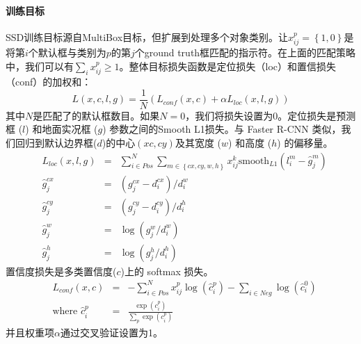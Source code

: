 \documentclass[../main.tex]{subfile}
\begin{document}
\paragraph{训练目标}

SSD训练目标源自MultiBox目标\cite{multibox1, multibox2}，但扩展到处理多个对象类别。让$x_{ij}^p = \left\{ 1, 0 \right\}$是将第$ i $个默认框与类别为$p$的第$j$个ground truth框匹配的指示符。在上面的匹配策略中，我们可以有$\sum_i x_{ij}^p \geq 1$。整体目标损失函数是定位损失（loc）和置信损失（conf）的加权和：
\begin{equation}
    L\left(x, c, l, g\right) = \frac{1}{N}\left( L_{conf}\left(x, c\right) + \alpha L_{loc}\left( x, l, g \right) \right)
\end{equation}
其中$N$是匹配了的默认框数目。如果$N=0$，我们将损失设置为0。定位损失是预测框 ($l$) 和地面实况框 ($g$) 参数之间的Smooth L1损失\cite{fast}。与 Faster R-CNN \cite{faster}类似，我们回归到默认边界框($d$)的中心$\left( xc, cy \right)$及其宽度 ($w$) 和高度 ($h$) 的偏移量。
\begin{equation}
    \begin{aligned}
         & L_{loc}\left( x, l, g \right) & = & \sum_{i\in Pos}^N \sum_{m \in \left\{ cx, cy,w, h \right\} } x_{ij}^k\text{smooth}_{L1}\left( l_i^m - \hat{g}_j^m \right) \\
         & \hat{g}_j^{cx}                & = & \left( g_j^{cx} - d_i^{cx} \right) / d_i^w                                                                                \\
         & \hat{g}_j^{cy}                & = & \left( g_j^{cy} - d_i^{cy} \right) / d_i^h                                                                                \\
         & \hat{g}_j^w                   & = & \log \left( g_j^w / d_i^w \right)                                                                                         \\
         & \hat{g}_j^h                   & = & \log \left( g_j^h / d_i^h \right)
    \end{aligned}
\end{equation}
置信度损失是多类置信度($c$)上的 softmax 损失。
\begin{equation}
    \begin{aligned}
         & L_{conf}\left(x, c\right) & = & -\sum_{i\in Pos}^N x_{ij}^p\log\left(\hat{c}_i^p\right) - \sum_{i\in Neg}\log\left( \hat{c}_i^0 \right) \\
         & \text{where } \hat{c}_i^p & = & \frac{\exp \left( c_i^p \right)}{\sum_p \exp \left(c_i^p\right)}
    \end{aligned}
\end{equation}
并且权重项$\alpha$通过交叉验证设置为1。
\end{document}
